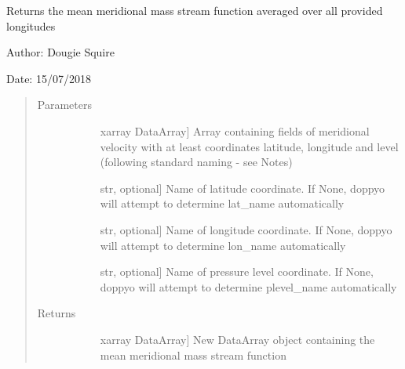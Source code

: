 \documentclass[letterpaper,10pt,english]{sphinxmanual}
\begin{document}

\begin{fulllineitems}
\label{\detokenize{diagnostic_doc:diagnostic.mean_merid_mass_streamfunction}}
Returns the mean meridional mass stream function averaged over all provided longitudes

\begin{DUlineblock}{0em}
\item[] Author: Dougie Squire
\item[] Date: 15/07/2018
\end{DUlineblock}
\begin{quote}\begin{description}
\item[{Parameters}] \leavevmode\begin{description}
\item[{}] \leavevmode{[}xarray DataArray{]}
Array containing fields of meridional velocity with at least coordinates latitude, longitude                     and level (following standard naming - see Notes)

\item[{}] \leavevmode{[}str, optional{]}
Name of latitude coordinate. If None, doppyo will attempt to determine lat\_name                     automatically

\item[{}] \leavevmode{[}str, optional{]}
Name of longitude coordinate. If None, doppyo will attempt to determine lon\_name                     automatically

\item[{}] \leavevmode{[}str, optional{]}
Name of pressure level coordinate. If None, doppyo will attempt to determine plevel\_name                    automatically

\end{description}

\item[{Returns}] \leavevmode\begin{description}
\item[{}] \leavevmode{[}xarray DataArray{]}
New DataArray object containing the mean meridional mass stream function


\end{description}
\end{description}
\end{quote}
\end{fulllineitems}
\end{document}
